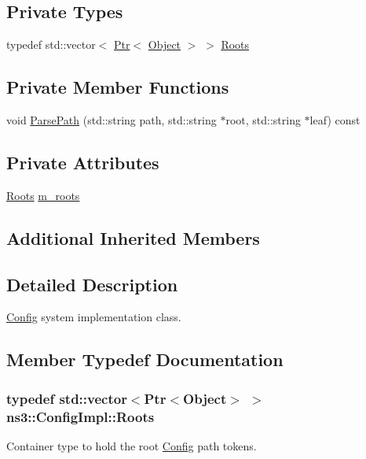 \subsection*{Private Types}
\begin{DoxyCompactItemize}
\item 
typedef std\+::vector$<$ \hyperlink{classns3_1_1Ptr}{Ptr}$<$ \hyperlink{classns3_1_1Object}{Object} $>$ $>$ \hyperlink{classns3_1_1ConfigImpl_ace78cf5b7ea82211da7a6b891fb55f31}{Roots}
\end{DoxyCompactItemize}
\subsection*{Private Member Functions}
\begin{DoxyCompactItemize}
\item 
void \hyperlink{classns3_1_1ConfigImpl_a2e54753e3eb9fc23d2470a6837ce8eaa}{Parse\+Path} (std\+::string path, std\+::string $\ast$root, std\+::string $\ast$leaf) const 
\end{DoxyCompactItemize}
\subsection*{Private Attributes}
\begin{DoxyCompactItemize}
\item 
\hyperlink{classns3_1_1ConfigImpl_ace78cf5b7ea82211da7a6b891fb55f31}{Roots} \hyperlink{classns3_1_1ConfigImpl_a54380ef7cb5b032793df59ecb3365dd3}{m\+\_\+roots}
\end{DoxyCompactItemize}
\subsection*{Additional Inherited Members}


\subsection{Detailed Description}
\hyperlink{namespacens3_1_1Config}{Config} system implementation class. 

\subsection{Member Typedef Documentation}
\subsubsection[{\texorpdfstring{Roots}{Roots}}]{\setlength{\rightskip}{0pt plus 5cm}typedef std\+::vector$<${\bf Ptr}$<${\bf Object}$>$ $>$ {\bf ns3\+::\+Config\+Impl\+::\+Roots}\hspace{0.3cm}{\ttfamily [private]}}\hypertarget{classns3_1_1ConfigImpl_ace78cf5b7ea82211da7a6b891fb55f31}{}\label{classns3_1_1ConfigImpl_ace78cf5b7ea82211da7a6b891fb55f31}
Container type to hold the root \hyperlink{namespacens3_1_1Config}{Config} path tokens. 


